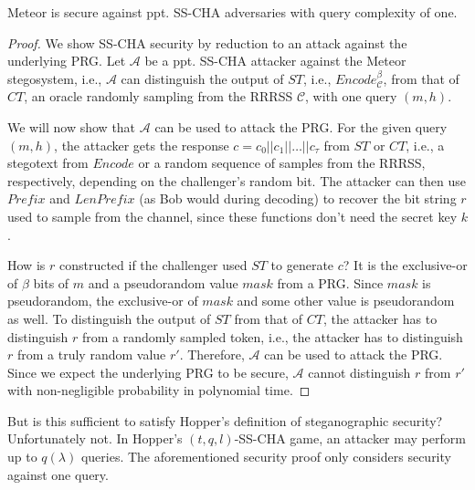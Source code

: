 \begin{theorem}
  Meteor is secure against ppt. SS-CHA adversaries with query complexity of one.
\label{thm:meteor-secure}
\end{theorem}
\begin{proof}
  We show SS-CHA security by reduction to an attack against the underlying PRG.
  Let $\mathcal{A}$ be a ppt. SS-CHA attacker against the Meteor stegosystem, i.e., $\mathcal{A}$ can distinguish the output of $ST$, i.e., $Encode_{\mathcal{C}}^\beta$, from that of $CT$, an oracle randomly sampling from the RRRSS $\mathcal{C}$, with one query $(m,h)$.
  
  We will now show that $\mathcal{A}$ can be used to attack the PRG.
  For the given query $(m,h)$, the attacker gets the response $c = c_0 ||c_1 || \dots || c_{\tau}$ from $ST$ or $CT$, i.e., a stegotext from $Encode$ or a random sequence of samples from the RRRSS, respectively, depending on the challenger's random bit.
  The attacker can then use $Prefix$ and $LenPrefix$ (as Bob would during decoding) to recover the bit string $r$ used to sample from the channel, since these functions don't need the secret key $k$.

  How is $r$ constructed if the challenger used $ST$ to generate $c$?
  It is the exclusive-or of $\beta$ bits of $m$ and a pseudorandom value $mask$ from a PRG.
  Since $mask$ is pseudorandom, the exclusive-or of $mask$ and some other value is pseudorandom as well.
  To distinguish the output of $ST$ from that of $CT$, the attacker has to distinguish $r$ from a randomly sampled token, i.e., the attacker has to distinguish $r$ from a truly random value $r'$.
  Therefore, $\mathcal{A}$ can be used to attack the PRG.
  Since we expect the underlying PRG to be secure, $\mathcal{A}$ cannot distinguish $r$ from $r'$ with non-negligible probability in polynomial time.
\end{proof}

But is this sufficient to satisfy Hopper's definition of steganographic security?
Unfortunately not.
In Hopper's $(t,q,l)$-SS-CHA game, an attacker may perform up to $q(\lambda)$ queries.
The aforementioned security proof only considers security against one query.

